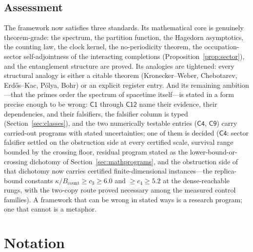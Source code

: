 \documentclass[11pt,a4paper]{article}
\theoremstyle{plain}
\theoremstyle{definition}
\theoremstyle{remark}
\begin{document}
\subsection{Assessment}

The framework now satisfies three standards. Its mathematical core is genuinely theorem-grade: the
spectrum, the
partition function, the Hagedorn asymptotics, the counting law, the clock kernel, the
no-periodicity theorem, the occupation-sector self-adjointness of the interacting
completions (Proposition~\ref{prop:sector}), and the entanglement structure are proved. Its
analogies are
tightened: every structural analogy is either
a citable theorem (Kronecker--Weber, Chebotarev, Erd\H{o}s--Kac, P\'olya,
Bohr) or an explicit register entry. And its remaining ambition---that the primes order the
spectrum of spacetime itself---is stated in a form precise enough to be wrong:
$\mathsf{C1}$ through $\mathsf{C12}$ name their evidence, their dependencies, and their
falsifiers, the falsifier column is typed (Section~\ref{sec:classes}), and the two
numerically testable entries ($\mathsf{C4}$, $\mathsf{C9}$) carry
carried-out programs with stated uncertainties; one of them is decided
($\mathsf{C4}$: sector falsifier settled on the obstruction side at every certified
scale, survival range bounded by the crossing floor, residual program stated as the
lower-bound-or-crossing dichotomy of Section~\ref{sec:mathprograms}, and the
obstruction side of that dichotomy now carries certified finite-dimensional
instances---the replica-bound constants
$\kappa/B_{\mathrm{count}}\ge c_{3}\ge6.0$ and $\ge c_{4}\ge5.2$ at the
dense-reachable rungs, with the two-copy route proved necessary among the
measured control families). A framework that can be wrong in stated
ways is a research program; one that
cannot is a metaphor.

\appendix

\section{Notation}\label{app:notation}
\end{document}
